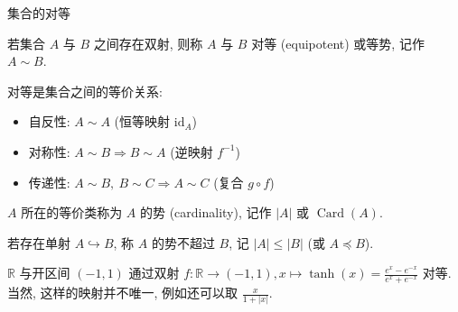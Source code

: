 \begin{frame}{集合的对等}

\begin{Def}[对等]
若集合 $A$ 与 $B$ 之间存在\alert{双射}, 则称 $A$ 与 $B$ \alert{对等} (equipotent) 或\alert{等势}, 记作 $A \sim B$.
\end{Def}

\pause
\vspace{0.3em}

对等是集合之间的\alert{等价关系}:
\begin{itemize}
  \item \alert{自反性}: $A \sim A$ (恒等映射 $\mathrm{id}_A$)
  \item \alert{对称性}: $A \sim B \Rightarrow B \sim A$ (逆映射 $f^{-1}$)
  \item \alert{传递性}: $A \sim B,\ B \sim C \Rightarrow A \sim C$ (复合 $g \circ f$)
\end{itemize}

\pause
\vspace{0.3em}

\begin{Def}[势与序]
$A$ 所在的等价类称为 $A$ 的\alert{势} (cardinality), 记作 $|A|$ 或 $\operatorname{Card}(A)$.

若存在单射 $A \hookrightarrow B$, 称 $A$ 的势\alert{不超过} $B$, 记 $|A| \leqslant |B|$ (或 $A \preccurlyeq B$).
\end{Def}

\pause
\vspace{0.3em}

\begin{eg}
$\mathbb{R}$ 与开区间 $(-1, 1)$ 通过双射 $f: \mathbb{R} \to (-1, 1), x \mapsto \tanh(x) = \frac{e^x - e^{-x}}{e^x + e^{-x}}$ 对等.
\pause
当然, 这样的映射并不唯一, 例如还可以取 $\frac{x}{1 + |x|}.$
\end{eg}

\end{frame}


